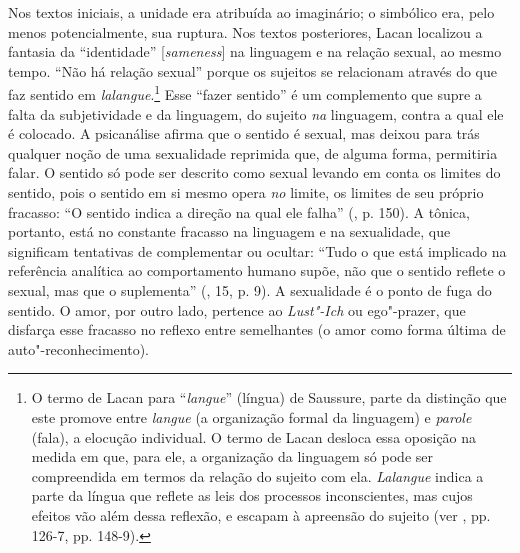 Nos textos iniciais, a unidade era atribuída ao imaginário; o simbólico
era, pelo menos potencialmente, sua ruptura. Nos textos posteriores,
Lacan localizou a fantasia da ``identidade'' {[}\emph{sameness}{]} na
linguagem e na relação sexual, ao mesmo tempo. ``Não há relação sexual''
porque os sujeitos se relacionam através do que faz sentido em
\emph{lalangue}.\footnote{O termo de Lacan para ``\emph{langue}''
  (língua) de Saussure, parte da distinção que este promove entre
  \emph{langue} (a organização formal da linguagem) e \emph{parole}
  (fala), a elocução individual. O termo de Lacan desloca essa oposição
  na medida em que, para ele, a organização da linguagem só pode ser
  compreendida em termos da relação do sujeito com ela. \emph{Lalangue}
  indica a parte da língua que reflete as leis dos processos
  inconscientes, mas cujos efeitos vão além dessa reflexão, e escapam à
  apreensão do sujeito (ver , pp. 126-7, pp. 148-9).} Esse ``fazer
sentido'' é um complemento que supre a falta da subjetividade e da
linguagem, do sujeito \emph{na} linguagem, contra a qual ele é colocado.
A psicanálise afirma que o sentido é sexual, mas deixou para trás
qualquer noção de uma sexualidade reprimida que, de alguma forma,
permitiria falar. O sentido só pode ser descrito como sexual levando em
conta os limites do sentido, pois o sentido em si mesmo opera \emph{no}
limite, os limites de seu próprio fracasso: ``O sentido indica a direção
na qual ele falha'' (, p. 150). A tônica, portanto, está no
constante fracasso na linguagem e na sexualidade, que significam
tentativas de complementar ou ocultar: ``Tudo o que está implicado na
referência analítica ao comportamento humano supõe, não que o sentido
reflete o sexual, mas que o suplementa'' (, 15, p. 9). A sexualidade
é o ponto de fuga do sentido. O amor, por outro lado, pertence ao
\emph{Lust"-Ich} ou ego"-prazer, que disfarça esse fracasso no reflexo
entre semelhantes (o amor como forma última de auto"-reconhecimento).

